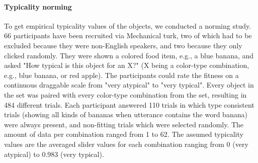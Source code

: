 \documentclass[10pt,letterpaper]{article}
\begin{document}
\paragraph{Typicality norming}
%
%
%

To get empirical typicality values of the objects, we conducted a norming study. 66 participants  have been recruited via Mechanical turk, two of which had to be excluded because they were non-English speakers, and two because they only clicked randomly.
They were shown a colored food item, e.g., a blue banana, and asked "How typical is this object for an X?" (X being a color-type combination, e.g., blue banana, or red apple). The participants could rate the fitness on a continuous draggable scale from "very atypical" to "very typical". Every object in the set was paired with every color-type combination from the set, resulting in 484 different trials. Each participant answered 110 trials in which type consistent trials (showing all kinds of bananas when utterance contains the word banana) were always present, and non-fitting trials which were selected randomly. The amount of data per combination ranged from 1 to 62. The assumed typicality values are the averaged slider values for each combination ranging from 0 (very atypical) to 0.983 (very typical). 
\end{document}
